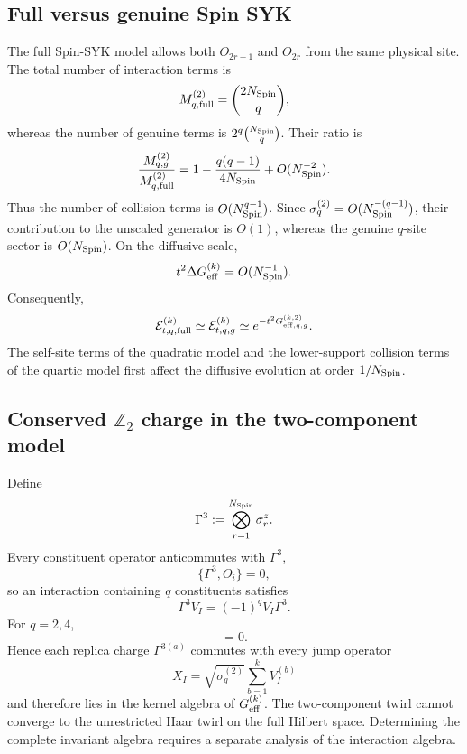 \documentclass{article}
\theoremstyle{definition}
\begin{document}
\subsection{Full versus genuine Spin SYK}

The full Spin-SYK model allows both $O_{2r-1}$ and $O_{2r}$ from the same
physical site.  The total number of interaction terms is
\begin{equation}
    M_{q,{\rm full}}^{(2)}=\binom{2N_{\rm Spin}}q,
\end{equation}
whereas the number of genuine terms is
$2^q\binom{N_{\rm Spin}}q$.  Their ratio is
\begin{equation}
    \frac{M_{q,g}^{(2)}}{M_{q,{\rm full}}^{(2)}}
    =1-\frac{q(q-1)}{4N_{\rm Spin}}
     +O(N_{\rm Spin}^{-2}).
\end{equation}
Thus the number of collision terms is $O(N_{\rm Spin}^{q-1})$.  Since
$\sigma_q^{(2)}=O(N_{\rm Spin}^{-(q-1)})$, their contribution to the
unscaled generator is $O(1)$, whereas the genuine $q$-site sector is
$O(N_{\rm Spin})$.  On the diffusive scale,
\begin{equation}
    t^2\Delta G_{\rm eff}^{(k)}=O(N_{\rm Spin}^{-1}).
\end{equation}
Consequently,
\begin{equation}
    {\cal E}_{t,q,{\rm full}}^{(k)}
    \simeq {\cal E}_{t,q,g}^{(k)}
    \simeq e^{-t^2G_{{\rm eff},q,g}^{(k,2)}}.
\end{equation}
The self-site terms of the quadratic model and the lower-support collision
terms of the quartic model first affect the diffusive evolution at order
$1/N_{\rm Spin}$.

\subsection{Conserved $\mathbb Z_2$ charge in the two-component model}

Define
\begin{equation}
    \Gamma^3:=\bigotimes_{r=1}^{N_{\rm Spin}}\sigma_r^z.
\end{equation}
Every constituent operator anticommutes with $\Gamma^3$,
\begin{equation}
    \{\Gamma^3,O_i\}=0,
\end{equation}
so an interaction containing $q$ constituents satisfies
\begin{equation}
    \Gamma^3V_I=(-1)^qV_I\Gamma^3.
\end{equation}
For $q=2,4$,
\begin{equation}
    [\Gamma^3,V_I]=0.
\end{equation}
Hence each replica charge $\Gamma^{3(a)}$ commutes with every jump operator
\begin{equation}
    X_I=\sqrt{\sigma_q^{(2)}}\sum_{b=1}^kV_I^{(b)}
\end{equation}
and therefore lies in the kernel algebra of $G_{\rm eff}^{(k)}$.  The
two-component twirl cannot converge to the unrestricted Haar twirl on the
full Hilbert space.  Determining the complete invariant algebra requires a
separate analysis of the interaction algebra.
\end{document}
